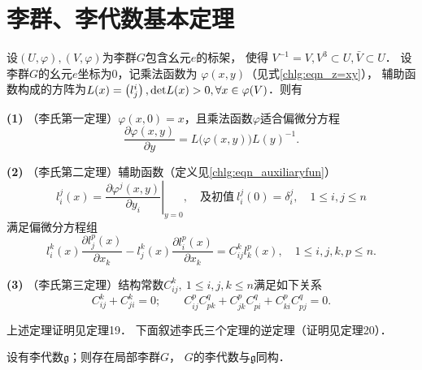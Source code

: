 \section{李群、李代数基本定理}\label{chlg:sec_Lie3thm}


\begin{theorem}
    设$(U, \varphi),(V, \varphi)$为李群$G$包含幺元$e$的标架，
    使得 $V^{-1}=V, V^3 \subset U, \bar{V} \subset U$．
    设李群$G$的幺元$e$坐标为$0$，记乘法函数为 $\varphi(x, y)$（见式\eqref{chlg:eqn_z=xy}），
    辅助函数构成的方阵为$L(x)=\left(l_j^i\right), {\rm det} L(x)>0,
    \forall x \in \varphi(V)$．则有
    
    \noindent  
    {\bfseries (1)} （李氏第一定理）$\varphi(x, 0)=x$，且乘法函数$\varphi$适合偏微分方程
    \begin{equation}
        \frac{\partial \varphi(x, y)}{\partial y}=L\bigl(\varphi(x, y)\bigr) L(y)^{-1} .
    \end{equation}
    
    \noindent  
    {\bfseries (2)} （李氏第二定理）辅助函数（定义见\eqref{chlg:eqn_auxiliaryfun}）
    \begin{equation}
        l_i^j(x)=\left.\frac{\partial \varphi^j(x, y)}{\partial y_i}\right|_{y=0},
        \quad \text{及初值}\ l_i^j(0)=\delta_i^j,
        \quad 1 \leqslant i, j \leqslant n
    \end{equation}
    满足偏微分方程组
    \begin{equation}
        l_i^k(x) \frac{\partial l_j^p(x)}{\partial x_k}-l_j^k(x)
        \frac{\partial l_i^p(x)}{\partial x_k}= C_{i j}^k l_k^p(x),
        \quad 1 \leqslant i, j,k, p \leqslant n .
    \end{equation}
    
    \noindent  
    {\bfseries (3)} （李氏第三定理）结构常数$C_{i j}^k,\ 1 \leqslant i, j, k \leqslant n$满足如下关系
    \begin{equation}\label{chlg:eqn_LC-Jacobi}
        C_{i j}^k+C_{j i}^k=0; \qquad
        C_{i j}^p C_{p k}^q +C_{j k}^p C_{p i}^q +C_{k i}^p C_{p j}^q=0 .
    \end{equation}
    
\end{theorem}

上述定理证明见\parencite[\S 3.7]{huangxg-2024}定理19．
下面叙述李氏三个定理的逆定理（证明见\parencite[\S 3.7]{huangxg-2024}定理20）．

\begin{theorem}\label{chlg:thm_Lie3inv}
    设有李代数$\mathfrak{g}$；则存在局部李群$G$，
    $G$的李代数与$\mathfrak{g}$同构．
\end{theorem}

